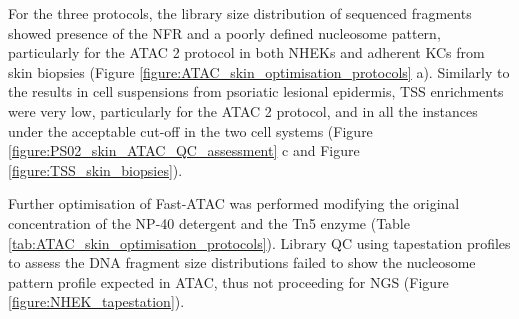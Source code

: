 For the three protocols, the library size distribution of sequenced fragments showed presence of the NFR and a poorly defined nucleosome pattern, particularly for the ATAC 2 protocol in both NHEKs and adherent KCs from skin biopsies (Figure \ref{figure:ATAC_skin_optimisation_protocols} a). Similarly to the results in cell suspensions from psoriatic lesional epidermis, TSS enrichments were very low, particularly for the ATAC 2 protocol, and in all the instances under the acceptable cut-off in the two cell systems (Figure \ref{figure:PS02_skin_ATAC_QC_assessment} c and Figure \ref{figure:TSS_skin_biopsies}).

Further optimisation of Fast-ATAC was performed modifying the original concentration of the NP-40 detergent and the Tn5 enzyme (Table \ref{tab:ATAC_skin_optimisation_protocols}). Library QC using tapestation profiles to assess the DNA fragment size distributions failed to show the nucleosome pattern profile expected in ATAC, thus not proceeding for NGS (Figure \ref{figure:NHEK_tapestation}).

 

